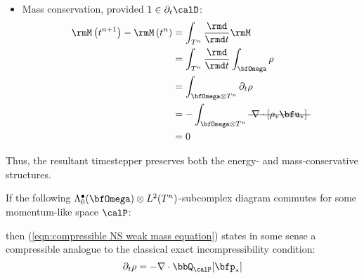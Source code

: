 \begin{itemize}
        \item  Mass conservation, provided $1 \in \partial_{t}\calD$:
        \begin{align}
                \rmM\left(t^{n + 1}\right) - \rmM\left(t^{n}\right)
                &=  \int_{T^{n}}\frac{\rmd}{\rmd t}\rmM  \\
                &=  \int_{T^{n}}\frac{\rmd}{\rmd t}\int_{\bfOmega}\rho  \\
                &=  \int_{\bfOmega\otimes T^{n}}\partial_{t}\rho  \\
                &=  - \int_{\bfOmega\otimes T^{n}}\mst{\nabla\cdot[\rho_{*}\bfu_{*}]}  \\
                &=  0
        \end{align}
    \end{itemize}
    Thus, the resultant timestepper preserves both the energy- and mass-conservative structures.

    \shortline

    If the following $\Lambda_{0}^{\bullet}(\bfOmega)\otimes L^{2}(T^{n})$-subcomplex diagram commutes for some momentum-like space $\calP$:
    \begin{center}\end{center}
    then (\ref{eqn:compressible NS weak mass equation}) states in some sense a compressible analogue to the classical exact incompressibility condition:
    \begin{equation}
        \partial_{t}\rho  =  - \nabla\cdot\bbQ_{\calP}[\bfp_{*}]
    \end{equation}

    \line

